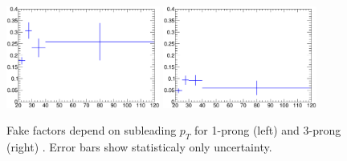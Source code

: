 \begin{figure}
	\begin{center}
	\includegraphics[width=0.45\textwidth]{figures/yy2tau/FF_1p.png}
	\includegraphics[width=0.45\textwidth]{figures/yy2tau/FF_3p.png}
	\caption{\label{fig:yy2tau:FFs} Fake factors depend on subleading \tauh $p_{T}$ for 1-prong (left) and 3-prong (right) \tauh. Error bars show statisticaly only uncertainty.}
	\end{center}
\end{figure}


